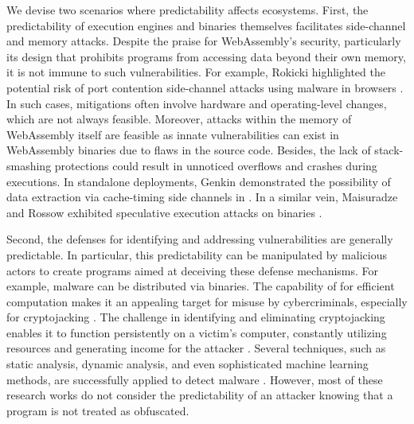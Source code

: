 
We devise two scenarios where predictability affects \Wasm ecosystems.
First, the predictability of execution engines and \Wasm binaries themselves facilitates side-channel and memory attacks.
Despite the praise for WebAssembly's security, particularly its design that prohibits programs from accessing data beyond their own memory, it is not immune to such vulnerabilities. 
For example, Rokicki \etal highlighted the potential risk of port contention side-channel attacks using \Wasm malware in browsers \cite{10.1145/3488932.3517411}. 
In such cases, mitigations often involve hardware and operating-level changes, which are not always feasible.
Moreover, attacks within the memory of WebAssembly itself are feasible\cite{usenixWasm2020} as innate vulnerabilities can exist in WebAssembly binaries due to flaws in the source code. 
Besides, the lack of stack-smashing protections could result in unnoticed overflows and crashes during \Wasm executions\cite{DeRoover2022}. 
In standalone deployments, Genkin \etal demonstrated the possibility of data extraction via cache-timing side channels in \Wasm \cite{Genkin2018DrivebyKC}. 
In a similar vein, Maisuradze and Rossow exhibited speculative execution attacks on \Wasm binaries \cite{ret2spec}.


Second, the defenses for identifying and addressing vulnerabilities are generally predictable. 
In particular, this predictability can be manipulated by malicious actors to create programs aimed at deceiving these defense mechanisms. 
For example, malware can be distributed via \Wasm binaries. 
The capability of \Wasm for efficient computation makes it an appealing target for misuse by cybercriminals, especially for cryptojacking \cite{10.1145/3339252.3339261}. 
The challenge in identifying and eliminating cryptojacking enables it to function persistently on a victim's computer, constantly utilizing resources and generating income for the attacker \cite{9566204}.  
Several techniques, such as static analysis, dynamic analysis, and even sophisticated machine learning methods, are successfully applied to detect \Wasm malware \cite{Minesweeper,MinerRay,MINOS,SEISMIC,RAPID,Outguard}. 
However, most of these research works do not consider the predictability of an attacker knowing that a \Wasm program is not treated as obfuscated.





